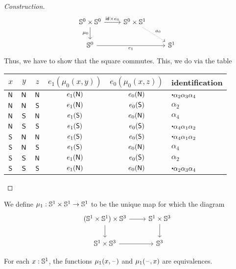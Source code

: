 \documentclass{article}
\begin{document}
\begin{proof}[Construction]
\begin{equation*}
\begin{tikzcd}
\Sn^0\times\Sn^0 \arrow[d,swap,"\mu_0"] \arrow[r,"\idfunc\times e_0"] & \Sn^0\times\Sn^1 \arrow[dr,densely dotted,"a_0"] \\
\Sn^0 \arrow[rr,swap,"e_1"] & & \Sn^1
\end{tikzcd}
\end{equation*}
Thus, we have to show that the square commutes. This, we do via the table
\begin{center}
\begin{tabular}{ccc|cc|l}
$x$ & $y$ & $z$ & $e_1(\mu_0(x,y))$ & $e_0(\mu_0(x,z))$ & identification \\
\midrule
$\mathsf{N}$ & $\mathsf{N}$ & $\mathsf{N}$ & $e_1(\mathsf{N})$ & $e_0(\mathsf{N})$ & $\ct{\alpha_2}{\alpha_3}{\alpha_4}$ \\
$\mathsf{N}$ & $\mathsf{N}$ & $\mathsf{S}$ & $e_1(\mathsf{N})$ & $e_0(\mathsf{S})$ & $\alpha_2$ \\
$\mathsf{N}$ & $\mathsf{S}$ & $\mathsf{N}$ & $e_1(\mathsf{S})$ & $e_0(\mathsf{N})$ & $\alpha_4$ \\
$\mathsf{N}$ & $\mathsf{S}$ & $\mathsf{S}$ & $e_1(\mathsf{S})$ & $e_0(\mathsf{S})$ & $\ct{\alpha_4}{\alpha_1}{\alpha_2}$ \\
$\mathsf{S}$ & $\mathsf{N}$ & $\mathsf{N}$ & $e_1(\mathsf{S})$ & $e_0(\mathsf{S})$ & $\ct{\alpha_4}{\alpha_1}{\alpha_2}$ \\
$\mathsf{S}$ & $\mathsf{N}$ & $\mathsf{S}$ & $e_1(\mathsf{S})$ & $e_0(\mathsf{N})$ & $\alpha_4$ \\
$\mathsf{S}$ & $\mathsf{S}$ & $\mathsf{N}$ & $e_1(\mathsf{N})$ & $e_0(\mathsf{S})$ & $\alpha_2$ \\
$\mathsf{S}$ & $\mathsf{S}$ & $\mathsf{S}$ & $e_1(\mathsf{N})$ & $e_0(\mathsf{N})$ & $\ct{\alpha_2}{\alpha_3}{\alpha_4}$
\end{tabular}
\end{center}
\end{proof}

\begin{defn}
We define $\mu_1:\mathbb{S}^1\times\mathbb{S}^1\to\mathbb{S}^1$ to be the unique map for which the
diagram
\begin{equation*}
\begin{tikzcd}
(\Sn^1\times\Sn^1)\times\Sn^3 \arrow[r] \arrow[d] & \Sn^1\times\Sn^3 \arrow[d] \\
\Sn^1\times\Sn^3 \arrow[r] & \Sn^3
\end{tikzcd}
\end{equation*}
\end{defn}

\begin{thm}
For each $x:\mathbb{S}^1$, the functions $\mu_1(x,\mathord{\hspace{1pt}\text{--}\hspace{1pt}})$ and $\mu_1(\mathord{\hspace{1pt}\text{--}\hspace{1pt}},x)$ are
equivalences. 
\end{thm}
\end{document}

